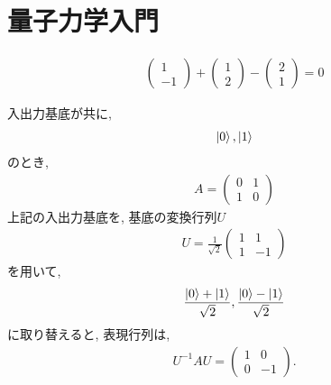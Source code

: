 \chapter{量子力学入門}


\begin{ex}
    \label{ex2.1}
    \begin{align*}
        \begin{pmatrix}
            1 \\ -1
        \end{pmatrix}
        +
        \begin{pmatrix}
            1 \\ 2
        \end{pmatrix}
        -
        \begin{pmatrix}
            2 \\ 1
        \end{pmatrix}
        =
        0
    \end{align*}
\end{ex}

\begin{ex}
    \label{ex2.2}
    入出力基底が共に,
    \begin{align*}
        \ket{0},\ket{1}
    \end{align*}
    のとき,
    \begin{align*}
        A
        =
        \begin{pmatrix}
            0 & 1 \\
            1 & 0
        \end{pmatrix}
    \end{align*}
    上記の入出力基底を, 基底の変換行列$U$
    \begin{align*}
        U
        =
        \frac{1}{\sqrt{2}}
        \begin{pmatrix}
            1 & 1  \\
            1 & -1
        \end{pmatrix}
    \end{align*}
    を用いて,
    \begin{align*}
        \frac{\ket{0}+\ket{1}}{\sqrt{2}},\frac{\ket{0}-\ket{1}}{\sqrt{2}}
    \end{align*}
    に取り替えると, 表現行列は,
    \begin{align*}
        U^{-1}AU
        =
        \begin{pmatrix}
            1 & 0  \\
            0 & -1
        \end{pmatrix}.
    \end{align*}
\end{ex}

